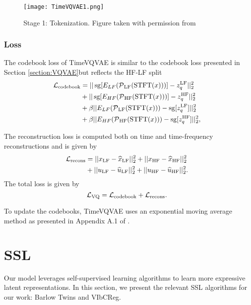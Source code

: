 \documentclass[../../thesis.tex]{subfiles}
\begin{document}
\begin{figure}[h]
    \texttt{[image: TimeVQVAE1.png]}
    \centering 
    \caption{Stage 1: Tokenization. Figure taken with permission from \cite{TimeVQVAE}}
    \label{fig:TimeVQVAE1}
\end{figure}

\subsubsection{Loss}

The codebook loss of TimeVQVAE is similar to the codebook loss presented in Section \ref{section:VQVAE}but reflects the HF-LF split
\begin{equation}
    \label{eq:TimeVQVAE_codebook}
    \begin{aligned}
        \mathcal{L}_\text{codebook} &= ||\operatorname{sg}[E_{LF}(\operatorname{\mathcal{P}}_{\mathrm{LF}}(\operatorname{\mathrm{STFT}}(x)))] - z_q^{\mathrm{LF}} ||_2^2 \\
                              &+ ||\operatorname{sg}[E_{HF}(\operatorname{\mathcal{P}}_{\mathrm{HF}}(\operatorname{\mathrm{STFT}}(x)))] - z_q^{\mathrm{HF}} ||_2^2 \\
                              &+ \beta||E_{LF}(\operatorname{\mathcal{P}}_{\mathrm{LF}}(\operatorname{\mathrm{STFT}}(x))) - \operatorname{sg}[z_q^{\mathrm{LF}}]||_2^2 \\
                              &+ \beta||E_{HF}(\operatorname{\mathcal{P}}_{\mathrm{HF}}(\operatorname{\mathrm{STFT}}(x))) - \operatorname{sg}[z_q^{\mathrm{HF}}]||_2^2,
    \end{aligned}
\end{equation}

The reconstruction loss is computed both on time and time-frequency reconstructions and is given by
\begin{equation}
    \label{eq:TimeVQVAE_recons}
    \begin{aligned}
        \mathcal{L}_\text{recons} &= ||x_{\mathrm{LF}} - \widehat{x}_{\mathrm{LF}} ||_2^2 + ||x_{\mathrm{HF}} - \widehat{x}_{\mathrm{HF}} ||_2^2\\
                              &+ ||u_{\mathrm{LF}} - \widehat{u}_{\mathrm{LF}} ||_2^2 + ||u_{\mathrm{HF}} - \widehat{u}_{\mathrm{HF}} ||_2^2.
    \end{aligned}
\end{equation}
The total loss is given by 
\begin{equation}
    \label{eq:TimeVQVAE_loss}
    \mathcal{L}_\text{VQ} = \mathcal{L}_\text{codebook} + \mathcal{L}_\text{recons}.
\end{equation}

To update the codebooks, TimeVQVAE uses an exponential moving average method as presented in Appendix A.1 of \cite{VQVAE}.


\section{SSL}
Our model leverages self-supervised learning algorithms to learn more expressive latent representations. In this section, we present the relevant SSL algorithms for our work: Barlow Twins and VIbCReg.
\end{document}
